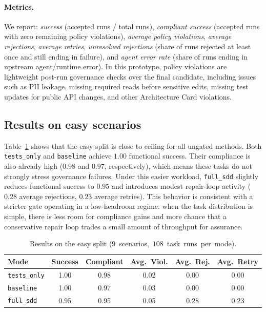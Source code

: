 \paragraph{Metrics.}
We report:
\textit{success} (accepted runs / total runs),
\textit{compliant success} (accepted runs with zero remaining policy violations),
\textit{average policy violations},
\textit{average rejections},
\textit{average retries},
\textit{unresolved rejections} (share of runs rejected at least once and still
ending in failure), and
\textit{agent error rate} (share of runs ending in upstream agent/runtime error).
In this prototype, policy violations are lightweight post-run governance checks
over the final candidate, including issues such as PII leakage, missing required
reads before sensitive edits, missing test updates for public API changes, and
other Architecture Card violations.

\subsection{Results on easy scenarios}

Table~\ref{tab:easy-results} shows that the easy split is close to ceiling for
all ungated methods. Both \texttt{tests\_only} and \texttt{baseline} achieve
$1.00$ functional success. Their compliance is also already high
($0.98$ and $0.97$, respectively), which means these tasks do not strongly
stress governance failures. Under this easier workload, \texttt{full\_sdd}
slightly reduces functional success to $0.95$ and introduces modest repair-loop
activity ($0.28$ average rejections, $0.23$ average retries). This behavior is
consistent with a stricter gate operating in a low-headroom regime: when the
task distribution is simple, there is less room for compliance gains and more
chance that a conservative repair loop trades a small amount of throughput for
assurance.

\begin{table}[t]
\centering
\small
\begin{tabular}{lccccc}
\toprule
\textbf{Mode} & \textbf{Success} & \textbf{Compliant} & \textbf{Avg.\ Viol.} & \textbf{Avg.\ Rej.} & \textbf{Avg.\ Retry} \\
\midrule
\texttt{tests\_only} & 1.00 & 0.98 & 0.02 & 0.00 & 0.00 \\
\texttt{baseline} & 1.00 & 0.97 & 0.03 & 0.00 & 0.00 \\
\texttt{full\_sdd} & 0.95 & 0.95 & 0.05 & 0.28 & 0.23 \\
\bottomrule
\end{tabular}
\caption{Results on the easy split (\mbox{$9$ scenarios, $108$ task runs per mode}).}
\label{tab:easy-results}
\end{table}

